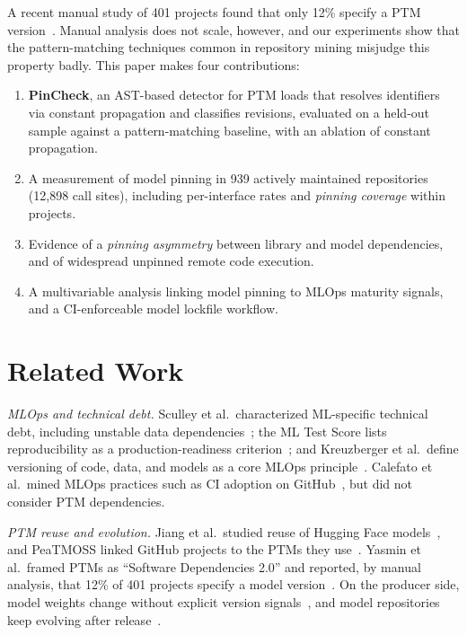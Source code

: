 \documentclass[conference]{IEEEtran}
\begin{document}
A recent manual study of 401 projects found that only 12\% specify a PTM version~\cite{yasmin2025}. Manual analysis does not scale, however, and our experiments show that the pattern-matching techniques common in repository mining misjudge this property badly. This paper makes four contributions:
\begin{enumerate}
\item \textbf{PinCheck}, an AST-based detector for PTM loads that resolves identifiers via constant propagation and classifies revisions, evaluated on a held-out sample against a pattern-matching baseline, with an ablation of constant propagation.
\item A measurement of model pinning in 939 actively maintained repositories (12,898 call sites), including per-interface rates and \emph{pinning coverage} within projects.
\item Evidence of a \emph{pinning asymmetry} between library and model dependencies, and of widespread unpinned remote code execution.
\item A multivariable analysis linking model pinning to MLOps maturity signals, and a CI-enforceable model lockfile workflow.
\end{enumerate}

\section{Related Work}
\textit{MLOps and technical debt.} Sculley et al.\ characterized ML-specific technical debt, including unstable data dependencies~\cite{sculley2015}; the ML Test Score lists reproducibility as a production-readiness criterion~\cite{breck2017}; and Kreuzberger et al.\ define versioning of code, data, and models as a core MLOps principle~\cite{kreuzberger2023}. Calefato et al.\ mined MLOps practices such as CI adoption on GitHub~\cite{calefato2022}, but did not consider PTM dependencies.

\textit{PTM reuse and evolution.} Jiang et al.\ studied reuse of Hugging Face models~\cite{jiang2023icse}, and PeaTMOSS linked GitHub projects to the PTMs they use~\cite{jiang2024peatmoss}. Yasmin et al.\ framed PTMs as ``Software Dependencies 2.0'' and reported, by manual analysis, that 12\% of 401 projects specify a model version~\cite{yasmin2025}. On the producer side, model weights change without explicit version signals~\cite{ajibode2025}, and model repositories keep evolving after release~\cite{castano2024}.
\end{document}
